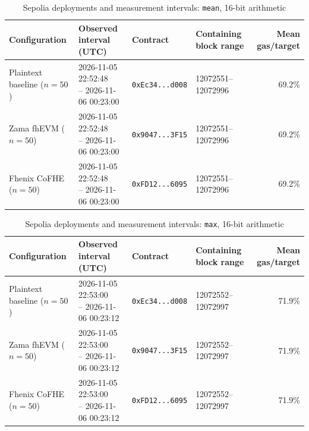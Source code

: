 \begin{table}[!t]
\caption{Sepolia deployments and measurement intervals: \texttt{mean}, 16-bit arithmetic}
\label{tab:sepolia-experiment-deployments-classic-euint16-mean}
\centering
\footnotesize
\setlength{\tabcolsep}{4pt}
\begin{tabular}{|l|l|l|l|r|}
\hline
\textbf{Configuration} &
\textbf{Observed interval (UTC)} &
\textbf{Contract} &
\textbf{Containing block range} &
\textbf{Mean gas/target} \\
\hline
Plaintext baseline (\(n=50\)) &
\shortstack[l]{2026-11-05 22:52:48 \\ -- 2026-11-06 00:23:00} &
\texttt{0xEc34...d008} &
12072551--12072996 &
69.2\% \\
\hline
Zama fhEVM (\(n=50\)) &
\shortstack[l]{2026-11-05 22:52:48 \\ -- 2026-11-06 00:23:00} &
\texttt{0x9047...3F15} &
12072551--12072996 &
69.2\% \\
\hline
Fhenix CoFHE (\(n=50\)) &
\shortstack[l]{2026-11-05 22:52:48 \\ -- 2026-11-06 00:23:00} &
\texttt{0xFD12...6095} &
12072551--12072996 &
69.2\% \\
\hline
\end{tabular}
\end{table}

\begin{table}[!t]
\caption{Sepolia deployments and measurement intervals: \texttt{max}, 16-bit arithmetic}
\label{tab:sepolia-experiment-deployments-classic-euint16-max}
\centering
\footnotesize
\setlength{\tabcolsep}{4pt}
\begin{tabular}{|l|l|l|l|r|}
\hline
\textbf{Configuration} &
\textbf{Observed interval (UTC)} &
\textbf{Contract} &
\textbf{Containing block range} &
\textbf{Mean gas/target} \\
\hline
Plaintext baseline (\(n=50\)) &
\shortstack[l]{2026-11-05 22:53:00 \\ -- 2026-11-06 00:23:12} &
\texttt{0xEc34...d008} &
12072552--12072997 &
71.9\% \\
\hline
Zama fhEVM (\(n=50\)) &
\shortstack[l]{2026-11-05 22:53:00 \\ -- 2026-11-06 00:23:12} &
\texttt{0x9047...3F15} &
12072552--12072997 &
71.9\% \\
\hline
Fhenix CoFHE (\(n=50\)) &
\shortstack[l]{2026-11-05 22:53:00 \\ -- 2026-11-06 00:23:12} &
\texttt{0xFD12...6095} &
12072552--12072997 &
71.9\% \\
\hline
\end{tabular}
\end{table}

